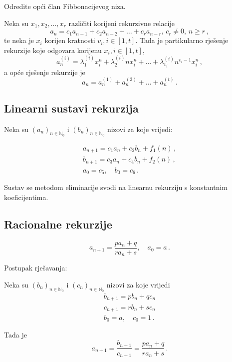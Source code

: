 \begin{example}
    Odredite opći član Fibbonacijevog niza.
\end{example}

\begin{theorem}
    Neka su $x_1,x_2,\dots,x_r$ različiti korijeni rekurzivne relacije
    $$
        a_n = c_1a_{n-1}+c_2a_{n-2}+\dots+c_ra_{n-r},\, c_r \neq 0,\, n \geq r\,,
    $$
    te neka je $x_i$ korijen kratnosti $v_i, i \in [1, t]$. Tada je partikularno rješenje rekurzije koje odgovara korijenu $x_i, i \in [1, t]$,
    $$
        a_n^{(i)} = \lambda_1^{(i)}x_i^n+\lambda_2^{(i)}nx_i^n+\dots+\lambda_{v_i}^{(i)}n^{v_i-1}x_i^n\,,
    $$
    a opće rješenje rekurzije je
    $$
        a_n = a_n^{(1)}+a_n^{(2)}+\dots+a_n^{(t)}\,.
    $$
\end{theorem}

\subsection{Linearni sustavi rekurzija}

\begin{example}
    Neka su $(a_n)_{n\in\mathbb{N}_0}$ i $(b_n)_{n\in\mathbb{N}_0}$ nizovi za koje vrijedi:

    \begin{gather*}
        a_{n+1} = c_1a_n+c_2b_n+f_1(n)\,,\\
        b_{n+1} = c_3a_n+c_4b_n+f_2(n)\,,\\
        a_0=c_5,\quad b_0=c_6\,.
    \end{gather*}
\end{example}

Sustav se metodom eliminacije svodi na linearnu rekurziju s konstantnim
koeficijentima.

\subsection{Racionalne rekurzije}

$$
a_{n+1} = \frac{pa_n+q}{ra_n+s},\quad a_0 = a\,.
$$

Postupak rješavanja:

Neka su $(b_n)_{n\in\mathbb{N}_0}$ i $(c_n)_{n\in\mathbb{N}_0}$ nizovi za koje vrijedi
\begin{gather*}
    b_{n+1} = pb_n + qc_n\\
    c_{n+1} = rb_n + sc_n\\
    b_0=a,\quad c_0 = 1\,.
\end{gather*}

Tada je
$$
    a_{n+1} = \frac{b_{n+1}}{c_{n+1}} = \frac{pa_n+q}{ra_n+s}\,.
$$